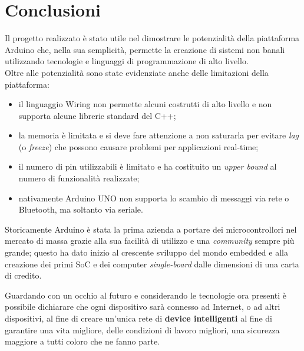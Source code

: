 \chapter{Conclusioni}
Il progetto realizzato è stato utile nel dimostrare le potenzialità della piattaforma Arduino che, nella sua semplicità, permette la creazione di sistemi non banali utilizzando tecnologie e linguaggi di programmazione di alto livello.\\ 
Oltre alle potenzialità sono state evidenziate anche delle limitazioni della piattaforma:
\begin{itemize}
	\item il linguaggio Wiring non permette alcuni costrutti di alto livello e non supporta alcune librerie standard del C++;
	\item la memoria è limitata e si deve fare attenzione a non saturarla per evitare \textit{lag} (o \textit{freeze}) che possono causare problemi per applicazioni real-time;
	\item il numero di pin utilizzabili è limitato e ha costituito un \textit{upper bound} al numero di funzionalità realizzate;
	\item nativamente Arduino UNO non supporta lo scambio di messaggi via rete o Bluetooth, ma soltanto via seriale.
\end{itemize}
Storicamente Arduino è stata la prima azienda a portare dei microcontrollori nel mercato di massa grazie alla sua facilità di utilizzo e una \textit{community} sempre più grande; questo ha dato inizio al crescente sviluppo del mondo embedded e alla creazione dei primi SoC e dei computer \textit{single-board} dalle dimensioni di una carta di credito.

Guardando con un occhio al futuro e considerando le tecnologie ora presenti è possibile dichiarare che ogni dispositivo sarà connesso ad Internet, o ad altri dispositivi, al fine di creare un'unica rete di \textbf{device intelligenti} al fine di garantire una vita migliore, delle condizioni di lavoro migliori, una sicurezza maggiore a tutti coloro che ne fanno parte.